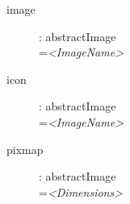 \begin{flushleft}
\begin{description}
\item[image]: abstractImage \\
    =\textit{<ImageName>}

\item[icon]: abstractImage \\
    =\textit{<ImageName>}

\item[pixmap]: abstractImage \\
    =\textit{<Dimensions>}

\end{description}
\end{flushleft}






















